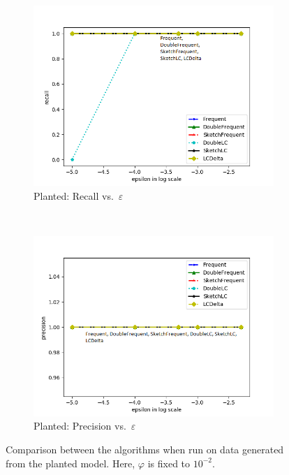 \documentclass[sigconf,review=true,anonymous=true,screen]{acmart}
\newcommand{\eps}{\varepsilon}
\renewcommand{\phi}{\varphi}
\begin{document}
\begin{figure}
\begin{subfigure}[b]{0.33\textwidth}
\includegraphics[width=\textwidth]{../Plots/recall_epsilon.png}
\caption{Planted: Recall vs.~$\eps$}
\label{fig:plreceps}
\end{subfigure}
~
\begin{subfigure}[b]{0.33\textwidth}
\includegraphics[width=\textwidth]{../Plots/precision_epsilon.png}
\caption{Planted: Precision vs.~$\eps$}
\label{fig:plpreeps}
\end{subfigure}
\caption{Comparison between the algorithms when run on data generated from the planted model. Here, $\phi$ is fixed to $10^{-2}$.}
\label{fig:fixphi}
\end{figure}
\end{document}
